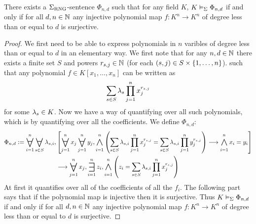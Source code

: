 \begin{lem}
    There exists a $\Sigma_{\mathrm{RNG}}$-sentence $\Phi_{n,d}$ such that 
    for any field $K$, $K \vDash_{\Sigma} \Phi_{n,d}$ if and only if
    for all $d,n \in \mathbb{N}$ any injective polynomial map $f : K^n \to K^n$
    of degree less than or equal to $d$ is surjective.
\end{lem}
\begin{proof}
    We first need to be able to express polynomials in $n$ varibles 
    of degree less than or equal to $d$ in an elementary way.
    We first note that for any $n,d \in \mathbb{N}$ there exists a finite set $S$
    and powers $r_{s,j}\in \mathbb{N}$ (for each $(s,j) \in S \times \left\{1, \dots, n\right\}$).
    such that any polynomial $f \in K[x_1, \dots, x_n]$ can be written as
    \[\sum_{s \in S} \lambda_s \prod_{j=1}^n x_j^{r_{s,j}}\]
    for some $\lambda_s \in K$.
    Now we have a way of quantifying over all such polynomials,
    which is by quantifying over all the coefficients.
    We define $\Phi_{n,d}$:
    \begin{align*}
        \Phi_{n,d}:= \bigforall{i = 1}{n} \bigforall{s \in S}{} \la_{s,i},
        &\sqbrkt{\bigforall{j = 1}{n}x_j \bigforall{j = 1}{n}y_j,
        \bigand{i = 1}{n} \brkt{
            \sum_{s \in S}\la_{s,i}\prod_{j = 1}^{n} x_j^{r_{s,j}} = 
            \sum_{s \in S}\la_{s,i}\prod_{j = 1}^{n} y_j^{r_{s,j}}
         }
         \longrightarrow \bigand{i = 1}{n} x_i = y_i}\\
         &\longrightarrow \bigforall{j = 1}{n} x_j, \bigexists{i = 1}{n} z_i,
         \bigand{i=1}{n}\brkt{z_i = \sum_{s \in S} 
         \la_{s,i}\prod_{j = 1}^{n} x_j^{r_{s,j}}
         }
    \end{align*}
    At first it quantifies over all of the coefficients of all the $f_i$.
    The following part says that if the polynomial map is injective then 
    it is surjective.
    Thus $K \vDash_{\Sigma} \Phi_{n,d}$ if and only if
    for all $d,n \in \mathbb{N}$ any injective polynomial map $f : K^n \to K^n$
    of degree less than or equal to $d$ is surjective.
\end{proof}

